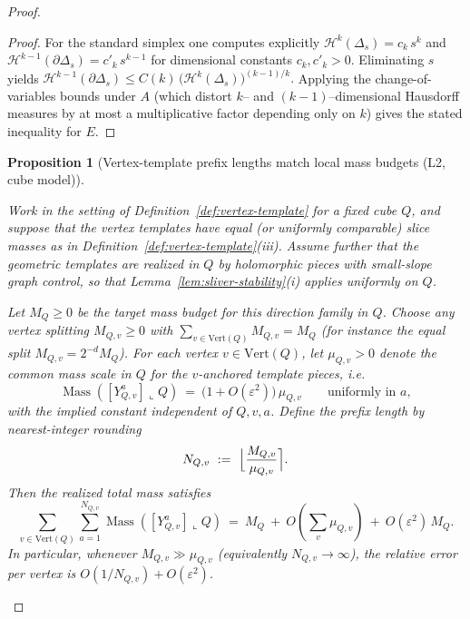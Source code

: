 \documentclass[11pt]{article}
\numberwithin{equation}{section}  %
\theoremstyle{plain}
\newtheorem{proposition}[theorem]{Proposition}
\theoremstyle{definition}
\theoremstyle{remark}
\DeclareMathOperator{\Mass}{Mass}
\begin{document}
\begin{proof}
\begin{proof}
For the standard simplex one computes explicitly
\(
\mathcal H^{k}(\Delta_s)=c_k\,s^k
\)
and
\(
\mathcal H^{k-1}(\partial\Delta_s)=c'_k\,s^{k-1}
\)
for dimensional constants $c_k,c'_k>0$.
Eliminating $s$ yields
\(
\mathcal H^{k-1}(\partial\Delta_s)\le C(k)\,\bigl(\mathcal H^k(\Delta_s)\bigr)^{(k-1)/k}.
\)
Applying the change-of-variables bounds under $A$ (which distort $k$-- and $(k-1)$--dimensional Hausdorff measures by at most a multiplicative factor depending only on $k$)
gives the stated inequality for $E$.
\end{proof}


\begin{proposition}[Vertex-template prefix lengths match local mass budgets (L2, cube model)]\label{prop:vertex-template-mass-matching}

Work in the setting of Definition~\ref{def:vertex-template} for a fixed cube $Q$, and suppose that the vertex templates have equal (or uniformly comparable) slice masses as in
Definition~\ref{def:vertex-template}\textnormal{(iii)}.  Assume further that the geometric templates are realized in $Q$ by holomorphic pieces with small-slope graph control,
so that Lemma~\ref{lem:sliver-stability}\textnormal{(i)} applies uniformly on $Q$.

\smallskip\noindent
Let $M_Q\ge 0$ be the target mass budget for this direction family in $Q$.  Choose any vertex splitting $M_{Q,v}\ge 0$ with
\(
\sum_{v\in\mathrm{Vert}(Q)} M_{Q,v}=M_Q
\)
(for instance the equal split $M_{Q,v}=2^{-d}M_Q$).
For each vertex $v\in\mathrm{Vert}(Q)$, let $\mu_{Q,v}>0$ denote the common mass scale in $Q$ for the $v$-anchored template pieces, i.e.
\[
\Mass([Y_{Q,v}^a]\llcorner Q)\ =\ \bigl(1+O(\varepsilon^2)\bigr)\,\mu_{Q,v}\qquad\text{uniformly in }a,
\]
with the implied constant independent of $Q,v,a$.
Define the prefix length by nearest-integer rounding
\[
N_{Q,v}\ :=\ \Bigl\lfloor \frac{M_{Q,v}}{\mu_{Q,v}}\Bigr\rceil .
\]
Then the realized total mass satisfies
\[
\sum_{v\in\mathrm{Vert}(Q)}\sum_{a=1}^{N_{Q,v}} \Mass([Y_{Q,v}^a]\llcorner Q)
\ =\ M_Q\ +\ O\!\left(\sum_{v}\mu_{Q,v}\right)\ +\ O(\varepsilon^2)\,M_Q.
\]
In particular, whenever $M_{Q,v}\gg \mu_{Q,v}$ (equivalently $N_{Q,v}\to\infty$), the relative error per vertex is
\(O(1/N_{Q,v})+O(\varepsilon^2)\).

\end{proposition}



\end{proof}
\end{document}
